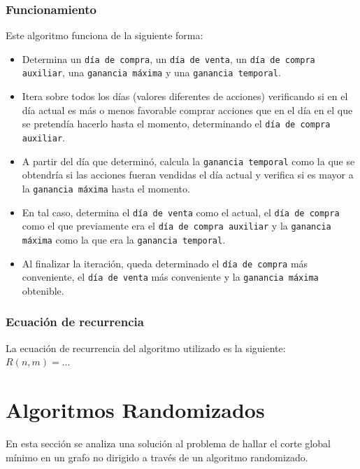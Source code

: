 \documentclass[a4paper, 10pt]{article}
\def\code#1{\texttt{#1}}
\newcommand\tab[1][0.5cm]{\hspace*{#1}}
\begin{document}
            \subsubsection{Funcionamiento}
                \tab Este algoritmo funciona de la siguiente forma:
                \begin{itemize}
                    \item Determina un \code{día de compra}, un \code{día de venta}, un \code{día de compra auxiliar},
                    una \code{ganancia máxima} y una \code{ganancia temporal}.
                    \item Itera sobre todos los días (valores diferentes de acciones) verificando si
                    en el día actual es más o menos favorable comprar acciones que en el día en el
                    que se pretendía hacerlo hasta el momento, determinando el \code{día de compra auxiliar}.
                    \item A partir del día que determinó, calcula la \code{ganancia temporal} como la que se obtendría
                    si las acciones fueran vendidas el día actual y verifica si es mayor a la \code{ganancia máxima}
                    hasta el momento.
                    \item En tal caso, determina el \code{día de venta} como el actual, el \code{día de compra}
                    como el que previamente era el \code{día de compra auxiliar} y la \code{ganancia máxima} como
                    la que era la \code{ganancia temporal}.
                    \item Al finalizar la iteración, queda determinado el \code{día de compra} más conveniente, el
                    \code{día de venta} más conveniente y la \code{ganancia máxima} obtenible.
                \end{itemize}
            \subsubsection{Ecuación de recurrencia}
                \tab La ecuación de recurrencia del algoritmo utilizado es la siguiente: \\
                \tab\tab\tab $ R(n, m) = ... $ %
    \newpage

    \section{Algoritmos Randomizados}
            En esta sección se analiza una solución al problema de hallar el corte global
        mínimo en un grafo no dirigido a través de un algoritmo randomizado.
\end{document}

